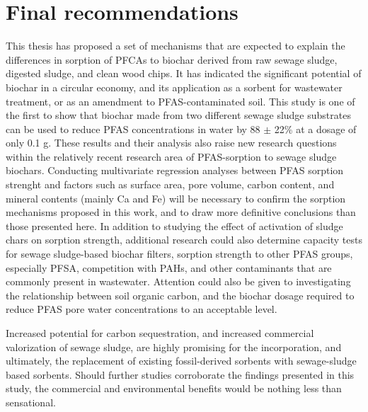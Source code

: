 \section{Final recommendations}
This thesis has proposed a set of mechanisms that are expected to explain the differences in sorption of PFCAs to biochar derived from raw sewage sludge, digested sludge, and clean wood chips. It has indicated the significant potential of biochar in a circular economy, and its application as a sorbent for wastewater treatment, or as an amendment to PFAS-contaminated soil. This study is one of the first to show that biochar made from two different sewage sludge substrates can be used to reduce PFAS concentrations in water by 88 $\pm$ 22\% at a dosage of only 0.1 g. These results and their analysis also raise new research questions within the relatively recent research area of PFAS-sorption to sewage sludge biochars. Conducting multivariate regression analyses between PFAS sorption strenght and factors such as surface area, pore volume, carbon content, and mineral contents (mainly Ca and Fe) will be necessary to confirm the sorption mechanisms proposed in this work, and to draw more definitive conclusions than those presented here.  In addition to studying the effect of activation of sludge chars on sorption strength, additional research could also determine capacity tests for sewage sludge-based biochar filters, sorption strength to other PFAS groups, especially PFSA, competition with PAHs, and other contaminants that are commonly present in wastewater. Attention could also be given to investigating the relationship between soil organic carbon, and the biochar dosage required to reduce PFAS pore water concentrations to an acceptable level. 

Increased potential for carbon sequestration, and increased commercial valorization of sewage sludge, are highly promising for the incorporation, and ultimately, the replacement of existing fossil-derived sorbents with sewage-sludge based sorbents. Should further studies corroborate the findings presented in this study, the commercial and environmental benefits would be nothing less than sensational. 







